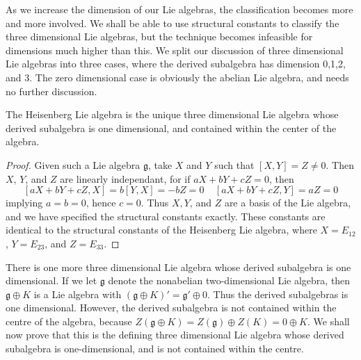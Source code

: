 As we increase the dimension of our Lie algebras, the classification becomes more and more involved. We shall be able to use structural constants to classify the three dimensional Lie algebras, but the technique becomes infeasible for dimensions much higher than this. We split our discussion of three dimensional Lie algebras into three cases, where the derived subalgebra has dimension 0,1,2, and 3. The zero dimensional case is obviously the abelian Lie algebra, and needs no further discussion.

\begin{theorem}
    The Heisenberg Lie algebra is the unique three dimensional Lie algebra whose derived subalgebra is one dimensional, and contained within the center of the algebra.
\end{theorem}
\begin{proof}
    Given such a Lie algebra $\mathfrak{g}$, take $X$ and $Y$ such that $[X,Y] = Z \neq 0$. Then $X$, $Y$, and $Z$ are linearly independant, for if $aX + bY + cZ = 0$, then
    \[ [aX + bY + cZ, X] = b[Y,X] = -bZ = 0\ \ \ \ \ [aX + bY + cZ, Y] = aZ = 0 \]
    implying $a = b = 0$, hence $c = 0$. Thus $X,Y$, and $Z$ are a basis of the Lie algebra, and we have specified the structural constants exactly. These constants are identical to the structural constants of the Heisenberg Lie algebra, where $X = E_{12}$, $Y = E_{23}$, and $Z = E_{33}$.
\end{proof}

There is one more three dimensional Lie algebra whose derived subalgebra is one dimensional. If we let $\mathfrak{g}$ denote the nonabelian two-dimensional Lie algebra, then $\mathfrak{g} \oplus K$ is a Lie algebra with $(\mathfrak{g} \oplus K)' = \mathfrak{g}' \oplus 0$. Thus the derived subalgebras is one dimensional. However, the derived subalgebra is not contained within the centre of the algebra, because $Z(\mathfrak{g} \oplus K) = Z(\mathfrak{g}) \oplus Z(K) = 0 \oplus K$. We shall now prove that this is the defining three dimensional Lie algebra whose derived subalgebra is one-dimensional, and is not contained within the centre.

